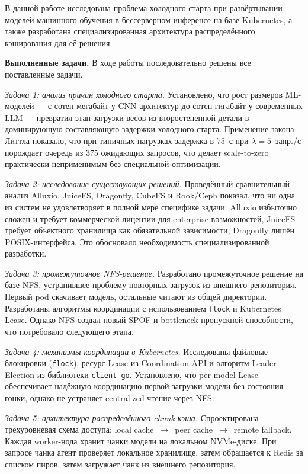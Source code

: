 
В данной работе исследована проблема холодного старта при развёртывании моделей машинного обучения в бессерверном инференсе на базе Kubernetes, а также разработана специализированная архитектура распределённого кэширования для её решения.

\textbf{Выполненные задачи.} В ходе работы последовательно решены все поставленные задачи.

\textit{Задача 1: анализ причин холодного старта.} Установлено, что рост размеров ML-моделей --- с сотен мегабайт у CNN-архитектур до сотен гигабайт у современных LLM --- превратил этап загрузки весов из второстепенной детали в доминирующую составляющую задержки холодного старта. Применение закона Литтла показало, что при типичных нагрузках задержка в 75~с при $\lambda = 5$~запр./с порождает очередь из 375 ожидающих запросов, что делает scale-to-zero практически неприменимым без специальной оптимизации.

\textit{Задача 2: исследование существующих решений.} Проведённый сравнительный анализ Alluxio, JuiceFS, Dragonfly, CubeFS и Rook/Ceph показал, что ни одна из систем не удовлетворяет в полной мере специфике задачи: Alluxio избыточно сложен и требует коммерческой лицензии для enterprise-возможностей, JuiceFS требует объектного хранилища как обязательной зависимости, Dragonfly лишён POSIX-интерфейса. Это обосновало необходимость специализированной разработки.

\textit{Задача 3: промежуточное NFS-решение.} Разработано промежуточное решение на базе NFS, устранившее проблему повторных загрузок из внешнего репозитория. Первый pod скачивает модель, остальные читают из общей директории. Разработаны алгоритмы координации с использованием \texttt{flock} и Kubernetes Lease. Однако NFS создал новый SPOF и bottleneck пропускной способности, что потребовало следующего этапа.

\textit{Задача 4: механизмы координации в Kubernetes.} Исследованы файловые блокировки (\texttt{flock}), ресурс Lease из Coordination API и алгоритм Leader Election из библиотеки \texttt{client-go}. Установлено, что per-model Lease обеспечивает надёжную координацию первой загрузки модели без состояния гонки, однако не устраняет centralized-чтение через NFS.

\textit{Задача 5: архитектура распределённого chunk-кэша.} Спроектирована трёхуровневая схема доступа: local cache~$\to$~peer cache~$\to$~remote fallback. Каждая worker-нода хранит чанки модели на локальном NVMe-диске. При запросе чанка агент проверяет локальное хранилище, затем обращается к Redis за списком пиров, затем загружает чанк из внешнего репозитория.

